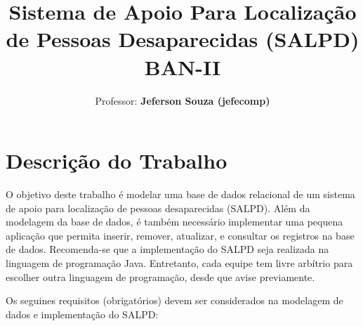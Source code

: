 \documentclass[12pt]{article}
\title{Sistema de Apoio Para Localização \\ de Pessoas Desaparecidas (SALPD)\\
BAN-II}
\author{Professor: \textbf{Jeferson Souza (jefecomp)}}
\begin{document}
\maketitle

\section{Descrição do Trabalho}

O objetivo deste trabalho é modelar uma base de dados relacional de um sistema de apoio para localização de pessoas desaparecidas (SALPD). Além da modelagem da base de dados, é também necessário implementar uma pequena aplicação que permita inserir, remover, atualizar, e consultar os registros na base de dados. Recomenda-se que a implementação do SALPD seja realizada na linguagem de programação Java. Entretanto, cada equipe tem livre arbítrio para escolher outra linguagem de programação, desde que avise previamente. 

Os seguines requisitos (obrigatórios) devem ser considerados na modelagem de dados e implementação do SALPD:
\end{document}
